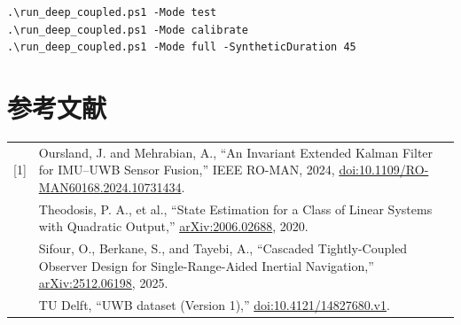 \documentclass[11pt,a4paper]{ctexart}
\begin{document}
\begin{verbatim}
.\run_deep_coupled.ps1 -Mode test
.\run_deep_coupled.ps1 -Mode calibrate
.\run_deep_coupled.ps1 -Mode full -SyntheticDuration 45
\end{verbatim}

\section*{参考文献}
\small
\setlength{\tabcolsep}{0pt}
\noindent
\begin{tabular}{@{}p{2.1em}p{\dimexpr\textwidth-2.1em\relax}@{}}
[1] & Oursland, J. and Mehrabian, A.,
``An Invariant Extended Kalman Filter for IMU--UWB Sensor Fusion,''
IEEE RO-MAN, 2024,
\href{https://doi.org/10.1109/RO-MAN60168.2024.10731434}
{doi:10.1109/RO-MAN60168.2024.10731434}.\\[0.2em]
[2] & Theodosis, P. A., et al.,
``State Estimation for a Class of Linear Systems with Quadratic Output,''
\href{https://arxiv.org/abs/2006.02688}{arXiv:2006.02688}, 2020.\\[0.2em]
[3] & Sifour, O., Berkane, S., and Tayebi, A.,
``Cascaded Tightly-Coupled Observer Design for Single-Range-Aided
Inertial Navigation,''
\href{https://arxiv.org/abs/2512.06198}{arXiv:2512.06198}, 2025.\\[0.2em]
[4] & TU Delft, ``UWB dataset (Version 1),''
\href{https://doi.org/10.4121/14827680.v1}
{doi:10.4121/14827680.v1}.\\
\end{tabular}
\end{document}
